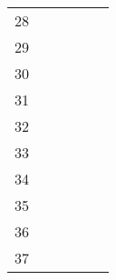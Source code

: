 \begin{table}[ht]
\begin{tabular}{c|lllll}
    28                       &                                          &                                           &                                                &                                    &                                      \\
    29                       &                                          &                                           &                                                &                                    &                                      \\
    30                       &                                          &                                           &                                                &                                    &                                      \\
    31                       &                                          &                                           &                                                &                                    &                                      \\
    32                       &                                          &                                           &                                                &                                    &                                      \\
    33                       &                                          &                                           &                                                &                                    &                                      \\
    34                       &                                          &                                           &                                                &                                    &                                      \\
    35                       &                                          &                                           &                                                &                                    &                                      \\
    36                       &                                          &                                           &                                                &                                    &                                      \\
    37                       &                                          &                                           &                                                &                                    &                                      \\

\end{tabular}
\end{table}
